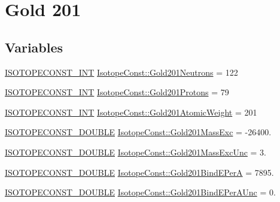\hypertarget{group___isotope_const-_gold-_au201}{}\section{Gold 201}
\label{group___isotope_const-_gold-_au201}
\subsection*{Variables}
\begin{DoxyCompactItemize}
\item 
\mbox{\hyperlink{group___isotope_const-_macros_ga5f18360b3e99483a35c32d789e62621c}{I\+S\+O\+T\+O\+P\+E\+C\+O\+N\+S\+T\+\_\+\+I\+NT}} \mbox{\hyperlink{group___isotope_const-_gold-_au201_ga16103a466f1dc402edbeaa1b10897777}{Isotope\+Const\+::\+Gold201\+Neutrons}} = 122
\item 
\mbox{\hyperlink{group___isotope_const-_macros_ga5f18360b3e99483a35c32d789e62621c}{I\+S\+O\+T\+O\+P\+E\+C\+O\+N\+S\+T\+\_\+\+I\+NT}} \mbox{\hyperlink{group___isotope_const-_gold-_au201_gae0c912e5f3824abdb7f0fda86c307e7b}{Isotope\+Const\+::\+Gold201\+Protons}} = 79
\item 
\mbox{\hyperlink{group___isotope_const-_macros_ga5f18360b3e99483a35c32d789e62621c}{I\+S\+O\+T\+O\+P\+E\+C\+O\+N\+S\+T\+\_\+\+I\+NT}} \mbox{\hyperlink{group___isotope_const-_gold-_au201_gafd7429f95e92c4e70902b8262e4a58ec}{Isotope\+Const\+::\+Gold201\+Atomic\+Weight}} = 201
\item 
\mbox{\hyperlink{group___isotope_const-_macros_ga8f45a7272ce02c0b4c65c44636ed719a}{I\+S\+O\+T\+O\+P\+E\+C\+O\+N\+S\+T\+\_\+\+D\+O\+U\+B\+LE}} \mbox{\hyperlink{group___isotope_const-_gold-_au201_ga098bb0cadb033058813deb98d173d576}{Isotope\+Const\+::\+Gold201\+Mass\+Exc}} = -\/26400.
\item 
\mbox{\hyperlink{group___isotope_const-_macros_ga8f45a7272ce02c0b4c65c44636ed719a}{I\+S\+O\+T\+O\+P\+E\+C\+O\+N\+S\+T\+\_\+\+D\+O\+U\+B\+LE}} \mbox{\hyperlink{group___isotope_const-_gold-_au201_ga50c06852ab56fccc85d449c418d0a24d}{Isotope\+Const\+::\+Gold201\+Mass\+Exc\+Unc}} = 3.
\item 
\mbox{\hyperlink{group___isotope_const-_macros_ga8f45a7272ce02c0b4c65c44636ed719a}{I\+S\+O\+T\+O\+P\+E\+C\+O\+N\+S\+T\+\_\+\+D\+O\+U\+B\+LE}} \mbox{\hyperlink{group___isotope_const-_gold-_au201_ga8e82317726fdcf38228149f54c7d6e30}{Isotope\+Const\+::\+Gold201\+Bind\+E\+PerA}} = 7895.
\item 
\mbox{\hyperlink{group___isotope_const-_macros_ga8f45a7272ce02c0b4c65c44636ed719a}{I\+S\+O\+T\+O\+P\+E\+C\+O\+N\+S\+T\+\_\+\+D\+O\+U\+B\+LE}} \mbox{\hyperlink{group___isotope_const-_gold-_au201_gafa2da24749b598b4102e8cb7e5f9e24b}{Isotope\+Const\+::\+Gold201\+Bind\+E\+Per\+A\+Unc}} = 0.

\end{DoxyCompactItemize}
